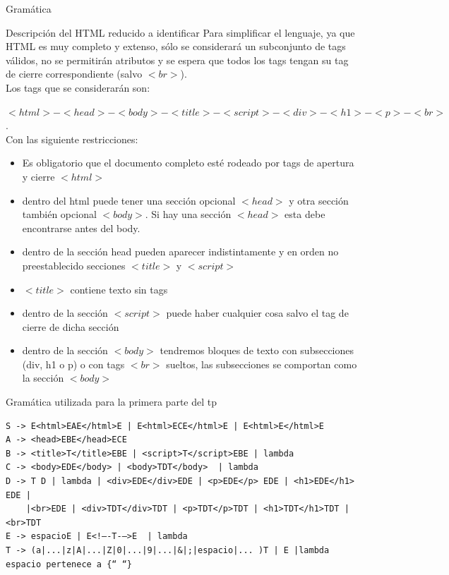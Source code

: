 \documentclass[a4paper,8pt]{article}
\begin{document}
\newpage
\begin{section}{Gramática}
\begin{subsection}{Descripción del HTML reducido a identificar}
Para simplificar el lenguaje, ya que HTML es muy completo y extenso, sólo se considerará un subconjunto de tags válidos, no se permitirán atributos y se espera que todos los tags tengan su tag de cierre correspondiente (salvo $<br>$).\\


Los tags que se considerarán son:

\textbf{$<html>-<head>-<body>-<title>-<script>-<div>-<h1>-<p>-<br>$}.\\

Con las siguiente restricciones:

\begin{itemize}
 \item Es obligatorio que el documento completo esté rodeado por tags de apertura y cierre $<html>$
\item dentro del html puede tener una sección opcional $<head>$ y otra sección también opcional $<body>$. Si hay una sección $<head>$ esta debe encontrarse antes del body.
\item dentro de la sección head pueden aparecer indistintamente y en orden no preestablecido secciones $<title>$ y $<script>$
\item $<title>$ contiene texto sin tags
\item dentro de la sección $<script>$ puede haber cualquier cosa salvo el tag de cierre de dicha sección
\item dentro de la sección $<body>$ tendremos bloques de texto con subsecciones (div, h1 o p) o con tags $<br>$ sueltos, las subsecciones se comportan como la sección $<body>$
\end{itemize}


\end{subsection}

\begin{subsection}{Gramática utilizada para la primera parte del tp}
\bigskip

\begin{verbatim}
S -> E<html>EAE</html>E | E<html>ECE</html>E | E<html>E</html>E
A -> <head>EBE</head>ECE
B -> <title>T</title>EBE | <script>T</script>EBE | lambda
C -> <body>EDE</body> | <body>TDT</body>  | lambda
D -> T D | lambda | <div>EDE</div>EDE | <p>EDE</p> EDE | <h1>EDE</h1> EDE |
    |<br>EDE | <div>TDT</div>TDT | <p>TDT</p>TDT | <h1>TDT</h1>TDT | <br>TDT
E -> espacioE | E<!–-T-–>E  | lambda 
T -> (a|...|z|A|...|Z|0|...|9|...|&|;|espacio|... )T | E |lambda  
espacio pertenece a {“ “}


\end{verbatim}
\end{subsection}
\end{section}
\end{document}
